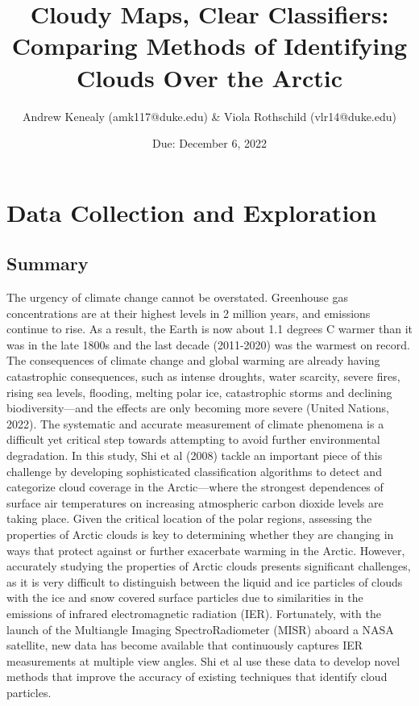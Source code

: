 \documentclass[12pt]{article}
\title{Cloudy Maps, Clear Classifiers: Comparing Methods of Identifying Clouds Over the Arctic}
\author{Andrew Kenealy (amk117@duke.edu) & Viola Rothschild (vlr14@duke.edu)}
\date{Due: December 6, 2022}
\begin{document}
\maketitle
\section{Data Collection and Exploration}
\subsection{Summary}

The urgency of climate change cannot be overstated. Greenhouse gas concentrations are at their highest levels in 2 million years, and emissions continue to rise. As a result, the Earth is now about 1.1 degrees C warmer than it was in the late 1800s and the last decade (2011-2020) was the warmest on record. The consequences of climate change and global warming are already having catastrophic consequences, such as intense droughts, water scarcity, severe fires, rising sea levels, flooding, melting polar ice, catastrophic storms and declining biodiversity---and the effects are only becoming more severe (United Nations, 2022). The systematic and accurate measurement of climate phenomena is a difficult yet critical step towards attempting to avoid further environmental degradation.  
\newline
\newline 
In this study, Shi et al (2008) tackle an important piece of this challenge by developing sophisticated classification algorithms to detect and categorize cloud coverage in the Arctic---where the strongest dependences of surface air temperatures on increasing atmospheric carbon dioxide levels are taking place. Given the critical location of the polar regions, assessing the properties of Arctic clouds is key to determining whether they are changing in ways that protect against or further exacerbate warming in the Arctic. However, accurately studying the properties of Arctic clouds presents significant challenges, as it is very difficult to distinguish between the liquid and ice particles of clouds with the ice and snow covered surface particles due to similarities in the emissions of infrared electromagnetic radiation (IER). Fortunately, with the launch of the Multiangle Imaging SpectroRadiometer (MISR) aboard a NASA satellite, new data has become available that continuously captures IER measurements at multiple view angles. Shi et al use these data to develop novel methods that improve the accuracy of existing techniques that identify cloud particles.  
\end{document}
